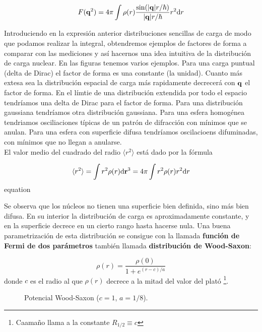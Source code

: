 \begin{equation}
	F(\mathbf{q}^2) = 4 \pi \int \rho (r) \frac{\sin (|\mathbf{q}|r/\hbar)}{ |\mathbf{q}| r / \hbar} r^2 \mathrm{d} r
\end{equation}

Introduciendo en la expresión anterior distribuciones sencillas de carga de modo que podamos realizar la integral, obtendremos ejemplos de factores de forma a comparar con las mediciones y así hacernos una idea intuitiva de la distribución de carga nuclear. En las figuras tenemos varios ejemplos. Para una carga puntual (delta de Dirac) el factor de forma es una constante (la unidad). Cuanto más extesa sea la distribución espacial de carga más rapidamente decrecerá con $\mathbf{q}$ el factor de forma. En el límtie de una distribución extendida por todo el espacio tendríamos una delta de Dirac para el factor de forma. Para una distribución gaussiana tendríamos otra distribución gaussiana. Para una esfera homogénea tendriamos osciliaciones típicas de un patrón de difracción con mínimos que se anulan. Para una esfera con superficie difusa tendríamos oscilacioens difuminadas, con mínimos que no llegan a anularse. \\


El valor medio del cuadrado del radio $\langle r^2 \rangle$ está dado por la fórmula

\begin{equation}
	\langle r^2 \rangle = \int r^2 \rho (r) \mathrm{d} \mathbf{r}^3 = 4\pi \int r^2 \rho (r) r^2 \mathrm{d} r
\end{equation} equation

Se observa que los núcleos no tienen una superficie bien definida, sino más bien difusa. En su interior la distribución de carga es aproximadamente constante, y en la superficie decrece en un cierto rango hasta hacerse nula. Una buena parametrización de esta distribución se consigue con la llamada \textbf{función de Fermi de dos parámetros} también llamada \textbf{distribución de Wood-Saxon}:

\begin{equation}
    \rho (r) = \frac{\rho(0)}{1+e^{(r-c)/a}}
\end{equation}
donde $c$ es el radio al que $\rho(r)$ decrece a la mitad del valor del plató \footnote{Caamaño llama a la constante $R_{1/2}\equiv c$}.
\begin{figure}[h!]  \centering
{}
\caption{Potencial Wood-Saxon ($c=1$, $a=1/8$).}
\label{Fig:01-03}
\end{figure}


